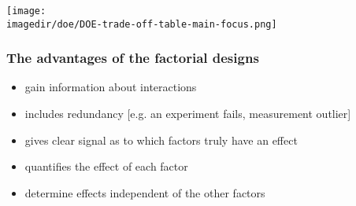 \documentclass[11pt,aspectratio=169,mathserif]{beamer}
\begin{document}
\begin{frame}\frametitle{}
	\centerline{\texttt{[image: \\imagedir/doe/DOE-trade-off-table-main-focus.png]}}
\end{frame}

\begin{frame}\frametitle{The advantages of the factorial designs}
	\begin{itemize}

		\item	gain information about interactions
		
		\item	includes redundancy [e.g. an experiment fails, measurement outlier]
				
		\item	gives clear signal as to which factors truly have an effect 
		
		\item	quantifies the effect of each factor
		
		\item 	determine effects independent of the other factors
	\end{itemize}
\end{frame}
\end{document}
